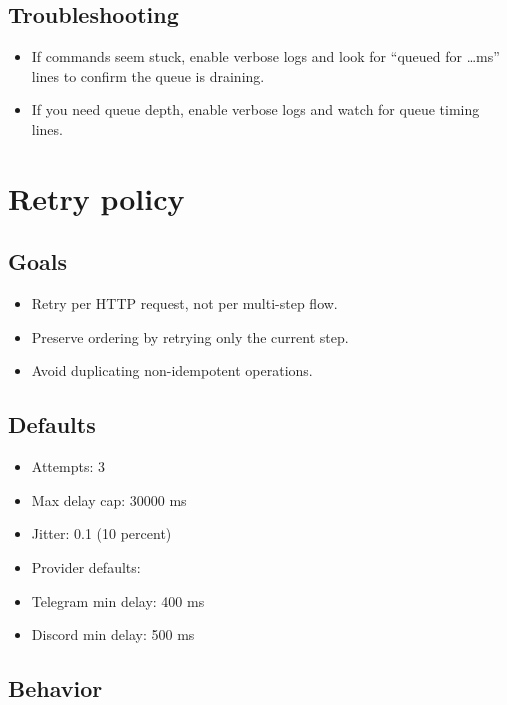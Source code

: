 \subsection{Troubleshooting}


\begin{itemize}
  \item If commands seem stuck, enable verbose logs and look for “queued for …ms” lines to confirm the queue is draining.
  \item If you need queue depth, enable verbose logs and watch for queue timing lines.
\end{itemize}



\clearpage

\section{Retry policy}


\subsection{Goals}


\begin{itemize}
  \item Retry per HTTP request, not per multi-step flow.
  \item Preserve ordering by retrying only the current step.
  \item Avoid duplicating non-idempotent operations.
\end{itemize}


\subsection{Defaults}


\begin{itemize}
  \item Attempts: 3
  \item Max delay cap: 30000 ms
  \item Jitter: 0.1 (10 percent)
  \item Provider defaults:
  \item Telegram min delay: 400 ms
  \item Discord min delay: 500 ms
\end{itemize}


\subsection{Behavior}


